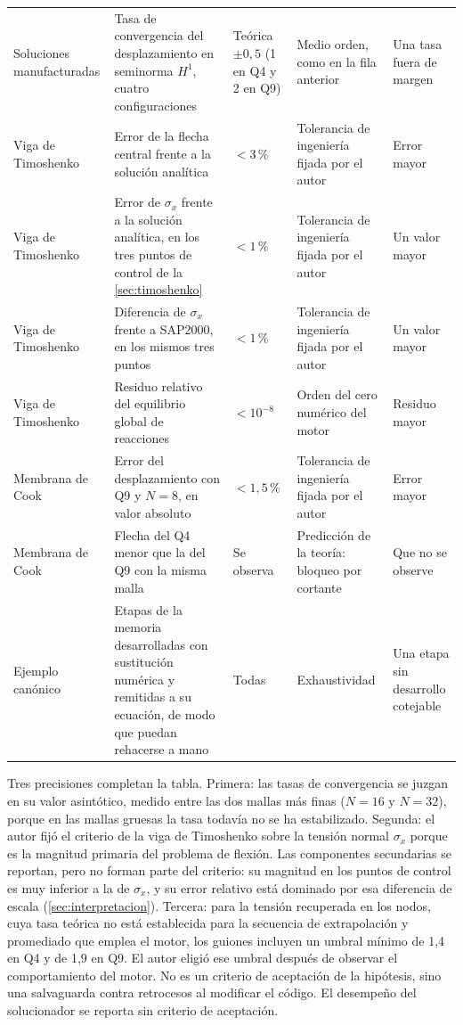 {\begin{longtable}{@{}>{\raggedright\arraybackslash}p{2.3cm}>{\raggedright\arraybackslash}p{3.6cm}>{\raggedright\arraybackslash}p{2.6cm}>{\raggedright\arraybackslash}p{3.0cm}>{\raggedright\arraybackslash}p{2.3cm}@{}}
Soluciones manufacturadas & Tasa de convergencia del desplazamiento en seminorma $H^1$, cuatro configuraciones & Teórica $\pm 0{,}5$ (1 en Q4 y 2 en Q9) & Medio orden, como en la fila anterior & Una tasa fuera de margen \\
Viga de Timoshenko & Error de la flecha central frente a la solución analítica & $< 3\,\%$ & Tolerancia de ingeniería fijada por el autor & Error mayor \\
Viga de Timoshenko & Error de $\sigma_x$ frente a la solución analítica, en los tres puntos de control de la \autoref{sec:timoshenko} & $< 1\,\%$ & Tolerancia de ingeniería fijada por el autor & Un valor mayor \\
Viga de Timoshenko & Diferencia de $\sigma_x$ frente a SAP2000, en los mismos tres puntos & $< 1\,\%$ & Tolerancia de ingeniería fijada por el autor & Un valor mayor \\
Viga de Timoshenko & Residuo relativo del equilibrio global de reacciones & $< 10^{-8}$ & Orden del cero numérico del motor & Residuo mayor \\
Membrana de Cook & Error del desplazamiento con Q9 y $N=8$, en valor absoluto & $< 1{,}5\,\%$ & Tolerancia de ingeniería fijada por el autor & Error mayor \\
Membrana de Cook & Flecha del Q4 menor que la del Q9 con la misma malla & Se observa & Predicción de la teoría: bloqueo por cortante & Que no se observe \\
Ejemplo canónico & Etapas de la memoria desarrolladas con sustitución numérica y remitidas a su ecuación, de modo que puedan rehacerse a mano & Todas & Exhaustividad & Una etapa sin desarrollo cotejable \\
\end{longtable}}

Tres precisiones completan la tabla. Primera: las tasas de convergencia se juzgan en su valor asintótico, medido entre las dos mallas más finas ($N=16$ y $N=32$), porque en las mallas gruesas la tasa todavía no se ha estabilizado. Segunda: el autor fijó el criterio de la viga de Timoshenko sobre la tensión normal $\sigma_x$ porque es la magnitud primaria del problema de flexión. Las componentes secundarias se reportan, pero no forman parte del criterio: su magnitud en los puntos de control es muy inferior a la de $\sigma_x$, y su error relativo está dominado por esa diferencia de escala (\autoref{sec:interpretacion}). Tercera: para la tensión recuperada en los nodos, cuya tasa teórica no está establecida para la secuencia de extrapolación y promediado que emplea el motor, los guiones incluyen un umbral mínimo de 1,4 en Q4 y de 1,9 en Q9. El autor eligió ese umbral después de observar el comportamiento del motor. No es un criterio de aceptación de la hipótesis, sino una salvaguarda contra retrocesos al modificar el código. El desempeño del solucionador se reporta sin criterio de aceptación.

